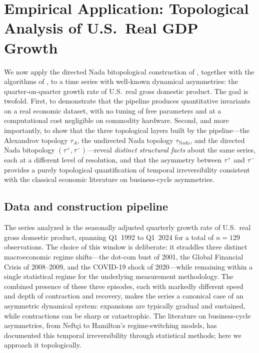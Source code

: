\documentclass[11pt,a4paper]{article}
\theoremstyle{plain}
\theoremstyle{definition}
\newcommand{\taufwd}{\tau^{+}}
\newcommand{\taubwd}{\tau^{-}}
\begin{document}
\section{Empirical Application: Topological Analysis of U.S.\ Real GDP Growth}%
\label{sec:empirical}

We now apply the directed Nada bitopological construction of
, together with the algorithms of
, to a time series with well-known dynamical
asymmetries: the quarter-on-quarter growth rate of U.S.\ real gross
domestic product. The goal is twofold. First, to demonstrate that the
pipeline produces quantitative invariants on a real economic dataset,
with no tuning of free parameters and at a computational cost negligible
on commodity hardware. Second, and more importantly, to show that the
three topological layers built by the pipeline---the Alexandrov topology
$\tau_A$, the undirected Nada topology $\tau_{\text{Nada}}$, and the
directed Nada bitopology $(\taufwd, \taubwd)$---reveal \emph{distinct
structural facts} about the same series, each at a different level of
resolution, and that the asymmetry between $\taufwd$ and $\taubwd$
provides a purely topological quantification of temporal irreversibility
consistent with the classical economic literature on business-cycle
asymmetries.

\subsection{Data and construction pipeline}\label{subsec:data}

The series analyzed is the seasonally adjusted quarterly growth rate of
U.S.\ real gross domestic product, spanning Q1~1992 to Q1~2024 for a
total of $n = 129$ observations. The choice of this window is deliberate:
it straddles three distinct macroeconomic regime shifts---the
dot-com bust of 2001, the Global Financial Crisis of 2008--2009, and
the COVID-19 shock of 2020---while remaining within a single statistical
regime for the underlying measurement methodology. The combined presence
of these three episodes, each with markedly different speed and depth of
contraction and recovery, makes the series a canonical case of an
asymmetric dynamical system: expansions are typically gradual and
sustained, while contractions can be sharp or catastrophic. The
literature on business-cycle asymmetries, from Neftçi to Hamilton's
regime-switching models, has documented this temporal irreversibility
through statistical methods; here we approach it topologically.
\end{document}
